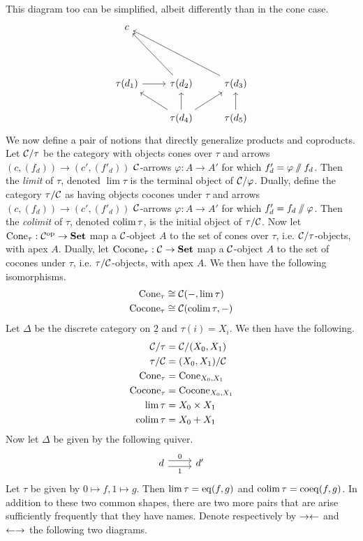This diagram too can be simplified, albeit differently than in the cone case. 
\[
\begin{tikzcd} 
c \\
{} \\
\tau(d_1) \arrow[r] & \tau(d_2) \arrow[uul] & \tau(d_3) \arrow[uull] \\
& \tau(d_4) \arrow[ul] \arrow[u] \arrow[ur]  & \tau(d_5) \arrow[u]
\end{tikzcd}
\]
We now define a pair of notions that directly generalize products and coproducts. Let ${\mathcal{C}}/\tau$ be the category with objects cones over $\tau$ and arrows $(c,(f_d))\to (c',(f'_d))$ $\mathcal{C}$-arrows $\varphi:A\to A'$ for which $f'_d=\varphi\sslash f_d$. Then the \emph{limit} of $\tau$, denoted $\lim\tau$ is the terminal object of $\mathcal{C}/\varphi$. Dually, define the category $\tau/\mathcal{C}$ as having objects cocones under $\tau$ and arrows $(c,(f_d))\to (c',(f'_d))$ $\mathcal{C}$-arrows $\varphi:A\to A'$ for which $f'_d= f_d\sslash\varphi $. Then the \emph{colimit} of $\tau$, denoted $\operatorname{colim}\tau$, is the initial object of $\tau/\mathcal{C}$. Now let $\operatorname{Cone}_\tau:\mathcal{C}^{\text{op}}\to\mathbf{Set}$ map a $\mathcal{C}$-object $A$ to the set of cones over $\tau$, i.e. $\mathcal{C}/\tau$-objects, with apex $A$. Dually, let $\operatorname{Cocone}_\tau:\mathcal{C}\to\mathbf{Set}$ map a $\mathcal{C}$-object $A$ to the set of cocones under $\tau$, i.e. $\tau/\mathcal{C}$-objects, with apex $A$. We then have the following isomorphisms.
\begin{align*}
    \operatorname{Cone}_\tau &\cong \mathcal{C}(-,\lim\tau ) \\
    \operatorname{Cocone}_\tau &\cong \mathcal{C}(\operatorname{colim}\tau,-)
\end{align*}
Let $\Delta$ be the discrete category on $\underline{2}$ and $\tau(i)=X_i$. We then have the following.
\begin{align*}
    \mathcal{C}/\tau&=\mathcal{C}/(X_0,X_1) \\ \tau/\mathcal{C}&=(X_0,X_1)/\mathcal{C}\\
    \operatorname{Cone}_\tau &= \operatorname{Cone}_{X_0,X_1} \\
    \operatorname{Cocone}_\tau &=\operatorname{Cocone}_{X_0,X_1} \\ 
    \lim\tau &= X_0\times X_1 \\
    \operatorname{colim}\tau &=X_0+X_1
\end{align*}
Now let $\Delta$ be given by the following quiver.
\[
\begin{tikzcd}
d \arrow[r,shift left=-0.7ex,"1"']\arrow[r,shift left=0.7ex,"0"]&d' 
\end{tikzcd}
\]
Let $\tau$ be given by $0\mapsto f,1\mapsto g$. Then $\lim\tau=\operatorname{eq}(f,g)$ and $\operatorname{colim}\tau=\operatorname{coeq}(f,g)$. In addition to these two common shapes, there are two more pairs that are arise sufficiently frequently that they have names. Denote respectively by $\to\leftarrow$ and $\leftarrow\to$ the following two diagrams.
